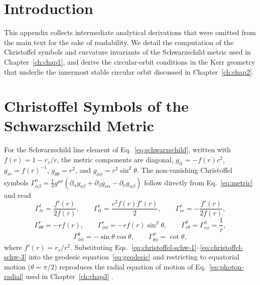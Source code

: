 \label{ann:B}

\section*{Introduction}

This appendix collects intermediate analytical derivations that were omitted from the main text for the sake of readability. We detail the computation of the Christoffel symbols and curvature invariants of the Schwarzschild metric used in Chapter~\ref{ch:chap1}, and derive the circular-orbit conditions in the Kerr geometry that underlie the innermost stable circular orbit discussed in Chapter~\ref{ch:chap2}.

\section*{Christoffel Symbols of the Schwarzschild Metric}

For the Schwarzschild line element of Eq.~\eqref{eq:schwarzschild}, written with $f(r) = 1 - r_s/r$, the metric components are diagonal, $g_{tt}=-f(r)c^2$, $g_{rr}=f(r)^{-1}$, $g_{\theta\theta}=r^2$, and $g_{\phi\phi}=r^2\sin^2\theta$. The non-vanishing Christoffel symbols $\Gamma^{\mu}_{\alpha\beta} = \tfrac{1}{2}g^{\mu\nu}\left(\partial_\alpha g_{\nu\beta} + \partial_\beta g_{\nu\alpha} - \partial_\nu g_{\alpha\beta}\right)$ follow directly from Eq.~\eqref{eq:metric} and read \cite{wald1984}
\begin{equation}
	\Gamma^{t}_{tr} = \frac{f'(r)}{2f(r)}, \qquad
	\Gamma^{r}_{tt} = \frac{c^2 f(r) f'(r)}{2}, \qquad
	\Gamma^{r}_{rr} = -\frac{f'(r)}{2f(r)},
	\label{eq:christoffel-schw-1}
\end{equation}
\begin{equation}
	\Gamma^{r}_{\theta\theta} = -r f(r), \qquad
	\Gamma^{r}_{\phi\phi} = -r f(r) \sin^2\theta, \qquad
	\Gamma^{\theta}_{r\theta} = \Gamma^{\phi}_{r\phi} = \frac{1}{r},
	\label{eq:christoffel-schw-2}
\end{equation}
\begin{equation}
	\Gamma^{\theta}_{\phi\phi} = -\sin\theta\cos\theta, \qquad
	\Gamma^{\phi}_{\theta\phi} = \cot\theta,
	\label{eq:christoffel-schw-3}
\end{equation}
where $f'(r)=r_s/r^2$. Substituting Eqs.~\eqref{eq:christoffel-schw-1}--\eqref{eq:christoffel-schw-3} into the geodesic equation~\eqref{eq:geodesic} and restricting to equatorial motion ($\theta=\pi/2$) reproduces the radial equation of motion of Eq.~\eqref{eq:photon-radial} used in Chapter~\ref{ch:chap3} \cite{hartle2003}.

